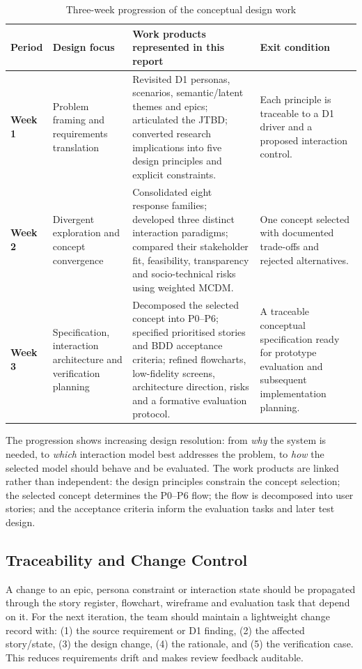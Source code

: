 \documentclass[12pt,a4paper]{article}
\begin{document}
\begin{table}[ht]
\centering
\small
\caption{Three-week progression of the conceptual design work}
\label{tab:three-week}
\begin{tabularx}{\textwidth}{@{}p{1.5cm}p{3.2cm}Xp{3.2cm}@{}}
\toprule
\textbf{Period} & \textbf{Design focus} & \textbf{Work products represented in this report} & \textbf{Exit condition}\\
\midrule
\textbf{Week 1} & Problem framing and requirements translation & Revisited D1 personas, scenarios, semantic/latent themes and epics; articulated the JTBD; converted research implications into five design principles and explicit constraints. & Each principle is traceable to a D1 driver and a proposed interaction control.\\
\rowcolor{brandlight}
\textbf{Week 2} & Divergent exploration and concept convergence & Consolidated eight response families; developed three distinct interaction paradigms; compared their stakeholder fit, feasibility, transparency and socio-technical risks using weighted MCDM. & One concept selected with documented trade-offs and rejected alternatives.\\
\textbf{Week 3} & Specification, interaction architecture and verification planning & Decomposed the selected concept into P0--P6; specified prioritised stories and BDD acceptance criteria; refined flowcharts, low-fidelity screens, architecture direction, risks and a formative evaluation protocol. & A traceable conceptual specification ready for prototype evaluation and subsequent implementation planning.\\
\bottomrule
\end{tabularx}
\end{table}

The progression shows increasing design resolution: from \emph{why} the system is needed, to \emph{which} interaction model best addresses the problem, to \emph{how} the selected model should behave and be evaluated. The work products are linked rather than independent: the design principles constrain the concept selection; the selected concept determines the P0--P6 flow; the flow is decomposed into user stories; and the acceptance criteria inform the evaluation tasks and later test design.

\subsection{Traceability and Change Control}
A change to an epic, persona constraint or interaction state should be propagated through the story register, flowchart, wireframe and evaluation task that depend on it. For the next iteration, the team should maintain a lightweight change record with: (1) the source requirement or D1 finding, (2) the affected story/state, (3) the design change, (4) the rationale, and (5) the verification case. This reduces requirements drift and makes review feedback auditable.
\end{document}
